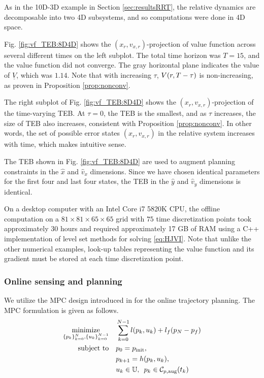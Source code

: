 As in the 10D-3D example in Section \ref{sec:resultsRRT}, the relative dynamics are decomposable into two 4D subsystems, and so computations were done in 4D space.

Fig. \ref{fig:vf_TEB:8D4D} shows the $(x_r, v_{x,r})$-projection of value function across several different times on the left subplot.
The total time horizon was $T=15$, and the value function did not converge.
The gray horizontal plane indicates the value of $\underline V$, which was $1.14$.
Note that with increasing $\tau$, $V(r,T-\tau)$ is non-increasing, as proven in Proposition \ref{prop:nonconv}.

The right subplot of Fig. \ref{fig:vf_TEB:8D4D} shows the $(x_r, v_{x,r})$-projection of the time-varying TEB.
At $\tau=0$, the TEB is the smallest, and as $\tau$ increases, the size of TEB also increases, consistent with Proposition \ref{prop:nonconv}.
In other words, the set of possible error states $(x_r, v_{x,r})$ in the relative system increases with time, which makes intuitive sense.

The TEB shown in Fig. \ref{fig:vf_TEB:8D4D} are used to augment planning constraints in the $\hat x$ and $\hat v_x$ dimensions.
Since we have chosen identical parameters for the first four and last four states, the TEB in the $\hat y$ and $\hat v_y$ dimensions is identical.

On a desktop computer with an Intel Core i7 5820K CPU, the offline computation on a $81\times81\times65\times65$ grid with $75$ time discretization points took approximately 30 hours and  required approximately 17 GB of RAM using a C++ implementation of level set methods for solving \eqref{eq:HJVI}.
Note that unlike the other numerical examples, look-up tables representing the value function and its gradient must be stored at each time discretization point.

\subsubsection{Online sensing and planning}
%
We utilize the MPC design introduced in \cite{Zhang2017} for the online trajectory planning. The MPC formulation is given as follows.
%
\begin{subequations} \label{eq:MPC}
  \begin{align}
  \underset{\{p_k\}_{k=0}^N, \{u_k\}_{k=0}^{N-1}}{\text{minimize}} \quad
  & \sum^{N-1}_{k=0} l(p_k,u_k) + l_f(p_N-p_f)  \\
  \text{subject to} \quad & p_0 = p_{\text{init}},\\
  &p_{k+1} = h(p_k,u_k),\\
  & u_k \in \mathbb{U},\enspace p_k \in \mathcal C_{p,\text{aug}}(t_k) 
  \end{align}
\end{subequations}

